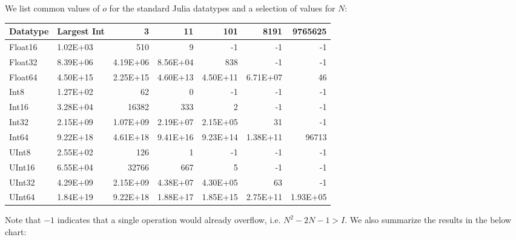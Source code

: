 We list common values of $o$ for the standard Julia datatypes and a selection of values for $N$:

\begin{center}
\begin{tabular}{llrrrrr}
\hline
\textbf{Datatype} & \multicolumn{1}{l}{\textbf{Largest Int}} & \textbf{3} & \textbf{11} & \textbf{101} & \textbf{8191} & \textbf{9765625} \\ \hline
Float16           & 1.02E+03                                     & 510        & 9           & -1           & -1            & -1               \\
Float32           & 8.39E+06                                     & 4.19E+06   & 8.56E+04    & 838          & -1            & -1               \\
Float64           & 4.50E+15                                     & 2.25E+15   & 4.60E+13    & 4.50E+11     & 6.71E+07      & 46               \\
Int8              & 1.27E+02                                     & 62         & 0           & -1           & -1            & -1               \\
Int16             & 3.28E+04                                     & 16382      & 333         & 2            & -1            & -1               \\
Int32             & 2.15E+09                                     & 1.07E+09   & 2.19E+07    & 2.15E+05     & 31            & -1               \\
Int64             & 9.22E+18                                     & 4.61E+18   & 9.41E+16    & 9.23E+14     & 1.38E+11      & 96713            \\
UInt8             & 2.55E+02                                     & 126        & 1           & -1           & -1            & -1               \\
UInt16            & 6.55E+04                                     & 32766      & 667         & 5            & -1            & -1               \\
UInt32            & 4.29E+09                                     & 2.15E+09   & 4.38E+07    & 4.30E+05     & 63            & -1               \\
UInt64            & 1.84E+19                                     & 9.22E+18   & 1.88E+17    & 1.85E+15     & 2.75E+11      & 1.93E+05         \\ \hline
\end{tabular}
\end{center}
%
Note that $-1$ indicates that a single operation would already overflow, i.e. $N^2 - 2N - 1 > I$. We also summarize the results in the below chart:

